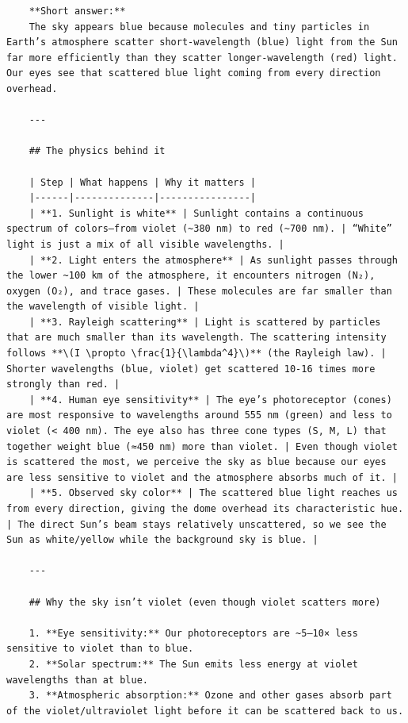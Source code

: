 \begin{verbatim}
    **Short answer:**  
    The sky appears blue because molecules and tiny particles in Earth’s atmosphere scatter short‑wavelength (blue) light from the Sun far more efficiently than they scatter longer‑wavelength (red) light. Our eyes see that scattered blue light coming from every direction overhead.
    
    ---
    
    ## The physics behind it
    
    | Step | What happens | Why it matters |
    |------|--------------|----------------|
    | **1. Sunlight is white** | Sunlight contains a continuous spectrum of colors—from violet (~380 nm) to red (~700 nm). | “White” light is just a mix of all visible wavelengths. |
    | **2. Light enters the atmosphere** | As sunlight passes through the lower ~100 km of the atmosphere, it encounters nitrogen (N₂), oxygen (O₂), and trace gases. | These molecules are far smaller than the wavelength of visible light. |
    | **3. Rayleigh scattering** | Light is scattered by particles that are much smaller than its wavelength. The scattering intensity follows **\(I \propto \frac{1}{\lambda^4}\)** (the Rayleigh law). | Shorter wavelengths (blue, violet) get scattered 10‑16 times more strongly than red. |
    | **4. Human eye sensitivity** | The eye’s photoreceptor (cones) are most responsive to wavelengths around 555 nm (green) and less to violet (< 400 nm). The eye also has three cone types (S, M, L) that together weight blue (≈450 nm) more than violet. | Even though violet is scattered the most, we perceive the sky as blue because our eyes are less sensitive to violet and the atmosphere absorbs much of it. |
    | **5. Observed sky color** | The scattered blue light reaches us from every direction, giving the dome overhead its characteristic hue. | The direct Sun’s beam stays relatively unscattered, so we see the Sun as white/yellow while the background sky is blue. |
    
    ---
    
    ## Why the sky isn’t violet (even though violet scatters more)
    
    1. **Eye sensitivity:** Our photoreceptors are ~5–10× less sensitive to violet than to blue.  
    2. **Solar spectrum:** The Sun emits less energy at violet wavelengths than at blue.  
    3. **Atmospheric absorption:** Ozone and other gases absorb part of the violet/ultraviolet light before it can be scattered back to us.
    

\end{verbatim}
